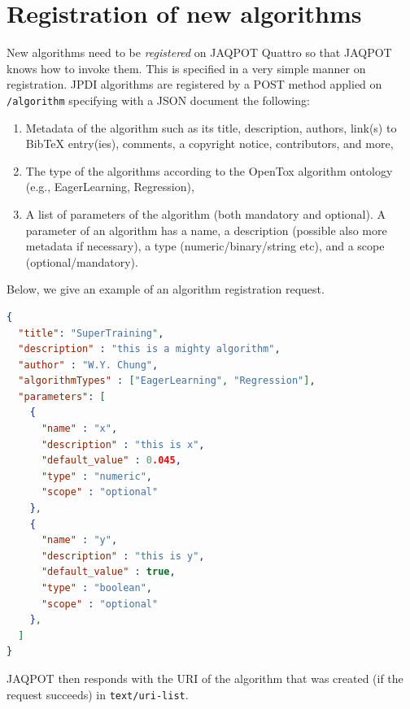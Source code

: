 \section{Registration of new algorithms}
New algorithms need to be \textit{registered} on JAQPOT Quattro
so that JAQPOT knows how to invoke them. This is specified in 
a very simple manner on registration. JPDI algorithms
are registered by a POST method applied on \texttt{/algorithm}
specifying with a JSON document the following:
\begin{enumerate}
 \item Metadata of the algorithm such as its title, description,
 authors, link(s) to BibTeX entry(ies), comments, a copyright notice,
 contributors, and more,
 \item The type of the algorithms according to the OpenTox algorithm
 ontology (e.g., EagerLearning, Regression),
 \item A list of parameters of the algorithm (both mandatory and optional).
 A parameter of an algorithm has a name, a description (possible also more
 metadata if necessary), a type (numeric/binary/string etc), and
 a scope (optional/mandatory).
\end{enumerate}
Below, we give an example of an algorithm registration request.

\begin{lstlisting}[language=json]
{
  "title": "SuperTraining",
  "description" : "this is a mighty algorithm",
  "author" : "W.Y. Chung",
  "algorithmTypes" : ["EagerLearning", "Regression"],
  "parameters": [
    {
      "name" : "x",
      "description" : "this is x",
      "default_value" : 0.045,
      "type" : "numeric",
      "scope" : "optional"
    },
    {
      "name" : "y",
      "description" : "this is y",
      "default_value" : true,
      "type" : "boolean",
      "scope" : "optional"
    },
  ]
} 
\end{lstlisting}

JAQPOT then responds with the URI of the algorithm that 
was created (if the request succeeds) in \texttt{text/uri-list}.